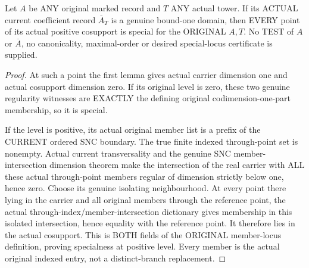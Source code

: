 \begin{theorem}
\label{hir:original-current-bar-curve-special-without-lower-test}
\leanok
Let $A$ be ANY original marked record and $T$ ANY actual tower. If its
ACTUAL current coefficient record $\overline A_T$ is a genuine bound-one
domain, then EVERY point of its actual positive cosupport is special
for the ORIGINAL $A,T$. No TEST of $A$ or $\overline A$, no canonicality,
maximal-order or desired special-locus certificate is supplied.
\end{theorem}
\begin{proof}
At such a point the first lemma gives actual carrier dimension one and
actual cosupport dimension zero. If its original level is zero, these
two genuine regularity witnesses are EXACTLY the defining original
codimension-one-part membership, so it is special.

If the level is positive, its actual original member list is a prefix
of the CURRENT ordered SNC boundary. The true finite indexed
through-point set is nonempty. Actual current transversality and the
genuine SNC member-intersection dimension theorem make the intersection
of the real carrier with ALL these actual through-point members regular
of dimension strictly below one, hence zero. Choose its genuine
isolating neighbourhood. At every point there lying in the carrier and
all original members through the reference point, the actual
through-index/member-intersection dictionary gives membership in this
isolated intersection, hence equality with the reference point. It
therefore lies in the actual cosupport. This is BOTH fields of the
ORIGINAL member-locus definition, proving specialness at positive
level. Every member is the actual original indexed entry, not a
distinct-branch replacement.
\end{proof}

